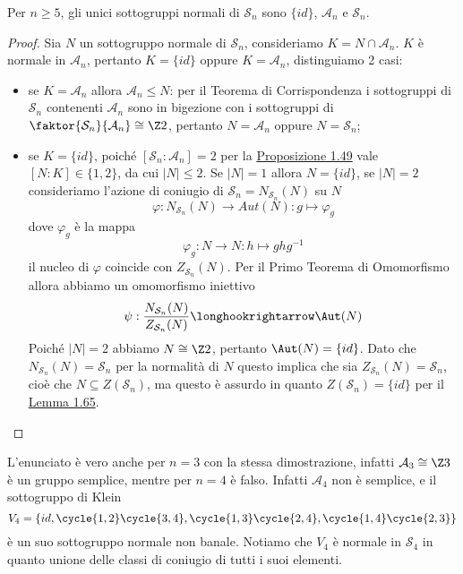 \documentclass[11pt]{scrartcl}
\begin{document}
\begin{proposition}
    Per $n\geq 5$, gli unici sottogruppi normali di $\mathcal{S}_n$ sono $\{id\}$,
    $\mathcal{A}_n$ e $\mathcal{S}_n$.
\end{proposition}

\begin{proof}
    Sia $N$ un sottogruppo normale di $\mathcal{S}_n$, consideriamo $K= N \cap \mathcal{A}_n$.
    $K$ è normale in $\mathcal{A}_n$, pertanto $K = \{id\}$ oppure $K = \mathcal{A}_n$,
    distinguiamo 2 casi:
    \begin{itemize}
        \item se $K = \mathcal{A}_n$ allora $\mathcal{A}_n \leqslant N$: per il
        Teorema di Corrispondenza i sottogruppi di $\mathcal{S}_n$ contenenti $\mathcal{A}_n$
        sono in bigezione con i sottogruppi di $\faktor{\mathcal{S}_n}{\mathcal{A}_n}\cong \Z2$,
        pertanto $N = \mathcal{A}_n$ oppure $N = \mathcal{S}_n$;
        \item se $K = \{id\}$, poiché $[\mathcal{S}_n:\mathcal{A}_n] = 2$ per la 
        \hyperref[prop1.49]{Proposizione 1.49} vale $[N:K] \in \{1, 2\}$, 
        da cui $|N| \leq 2$. Se $|N| = 1$ allora $N = \{id\}$, se $|N| = 2$
        consideriamo l'azione di coniugio di $\mathcal{S}_n = N_{\mathcal{S}_n}(N)$ su $N$
        \[
            \varphi: N_{\mathcal{S}_n}(N)\longrightarrow Aut(N): g \longmapsto \varphi_g
        \]
        dove $\varphi_g$ è la mappa
        \[
            \varphi_g:N \longrightarrow N :h \longmapsto ghg^{-1}
        \]
        il nucleo di $\varphi$ coincide con $Z_{\mathcal{S}_n}(N)$. Per il Primo Teorema
        di Omomorfismo allora abbiamo un omomorfismo iniettivo
        \[
            \psi :\frac{N_{\mathcal{S}_n}(N)}{Z_{\mathcal{S}_n}(N)}\longhookrightarrow \Aut(N)
        \]
        Poiché $|N| = 2$ abbiamo $N \cong \Z2$, pertanto $\Aut(N) = \{id\}$. 
        Dato che $N_{\mathcal{S}_n}(N) = \mathcal{S}_n$ per la normalità di $N$ questo implica che
        sia $Z_{\mathcal{S}_n}(N) = \mathcal{S}_n$, cioè che $N \subseteq Z(\mathcal{S}_n)$, ma questo è assurdo
        in quanto $Z(\mathcal{S}_n) = \{id\}$ per il \hyperref[lemma1.65]{Lemma 1.65}.
    \end{itemize}
\end{proof}

\begin{remark}
    L'enunciato è vero anche per $n = 3$ con la stessa dimostrazione, infatti
    $\mathcal{A}_3 \cong \Z3$ è un gruppo semplice, mentre per $n = 4$ è falso.
    Infatti $\mathcal{A}_4$ non è semplice, e il sottogruppo di Klein
    \[
        V_4 = \{id, \cycle{1, 2}\cycle{3, 4}, \cycle{1, 3}\cycle{2, 4}, \cycle{1, 4}\cycle{2, 3}\}
    \]
    è un suo sottogruppo normale non banale. Notiamo che $V_4$ è normale in 
    $\mathcal{S}_4$ in quanto unione delle classi di coniugio di tutti i suoi elementi.
\end{remark}
\end{document}

